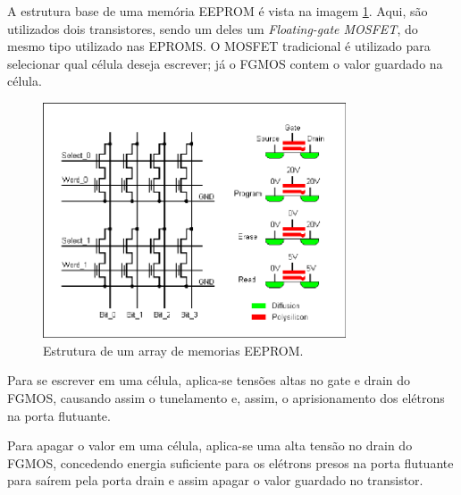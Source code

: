 \documentclass{article}
\begin{document}
A estrutura base de uma memória EEPROM é vista na imagem \ref{fig:EEPromStructure}. Aqui, são utilizados dois transistores, sendo um deles um \textit{Floating-gate MOSFET}, do mesmo tipo utilizado nas EPROMS. O MOSFET tradicional é utilizado para selecionar qual célula deseja escrever; já o FGMOS contem o valor guardado na célula.

\begin{figure}[h!] 
    \centering 
    \includegraphics[width=0.8\textwidth]{eepromgood.png}
    \caption{Estrutura de um array de memorias EEPROM.} 
    \label{fig:EEPromStructure} 
\end{figure}

Para se escrever em uma célula, aplica-se tensões altas no gate e drain do FGMOS, causando assim o tunelamento e, assim, o aprisionamento dos elétrons na porta flutuante.

Para apagar o valor em uma célula, aplica-se uma alta tensão no drain do FGMOS, concedendo energia suficiente para os elétrons presos na porta flutuante para saírem pela porta drain e assim apagar o valor guardado no transistor.
\end{document}
